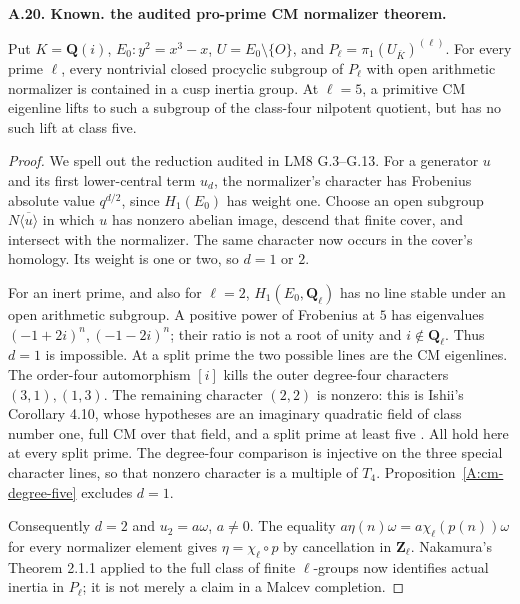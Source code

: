 \documentclass[11pt,oneside]{article}
\makeatletter
\newcounter{statementanchor}
\newenvironment{statement}[3]{%
 \refstepcounter{statementanchor}\def\@currentlabel{#1}%
 \par\addvspace{9pt}\noindent
 \textbf{#1. #2. #3.}\par\nobreak\noindent\ignorespaces
}{\par\addvspace{5pt}}
\makeatother
\begin{document}
\begin{statement}{A.20}{Known}{the audited pro-prime CM normalizer theorem}
\label{st:A.20}
\label{A:cm-prime-normalizer}
Put $K=\mathbf Q(i)$, $E_0:y^2=x^3-x$,
$U=E_0\setminus\{O\}$, and
$P_\ell=\pi_1(U_{\overline K})^{(\ell)}$.
For every prime $\ell$, every nontrivial closed
procyclic subgroup of $P_\ell$ with open arithmetic
normalizer is contained in a cusp inertia group.
At $\ell=5$, a primitive CM eigenline lifts to
such a subgroup of the class-four nilpotent
quotient, but has no such lift at class five.
\end{statement}
\begin{proof}
We spell out the reduction audited in LM8 G.3--G.13.
For a generator $u$ and its first lower-central
term $u_d$, the normalizer's character has
Frobenius absolute value $q^{d/2}$, since
$H_1(E_0)$ has weight one.  Choose an open
subgroup $N\overline{\langle u\rangle}$ in
which $u$ has nonzero abelian image, descend
that finite cover, and intersect with the
normalizer.  The same character now occurs
in the cover's homology.  Its weight is one
or two, so $d=1$ or $2$.

For an inert prime, and also for $\ell=2$,
$H_1(E_0,\mathbf Q_\ell)$ has no line stable
under an open arithmetic subgroup.  A positive
power of Frobenius at $5$ has eigenvalues
$(-1+2i)^n,(-1-2i)^n$; their ratio is not
a root of unity and $i\notin\mathbf Q_\ell$.
Thus $d=1$ is impossible.  At a split prime
the two possible lines are the CM eigenlines.
The order-four automorphism $[i]$ kills the
outer degree-four characters $(3,1),(1,3)$.
The remaining character $(2,2)$ is nonzero:
this is Ishii's Corollary 4.10, whose hypotheses
are an imaginary quadratic field of class
number one, full CM over that field, and a
split prime at least five
\cite{A_Ishii2025}.  All hold here at every
split prime.  The degree-four comparison
is injective on the three special character
lines, so that nonzero character is a multiple
of $T_4$.  Proposition~\ref{A:cm-degree-five}
excludes $d=1$.

Consequently $d=2$ and $u_2=a\omega$, $a\ne0$.
The equality
$a\eta(n)\omega=a\chi_\ell(p(n))\omega$
for every normalizer element gives
$\eta=\chi_\ell\circ p$ by cancellation in
$\mathbf Z_\ell$.  Nakamura's Theorem 2.1.1
applied to the full class of finite
$\ell$-groups now identifies actual inertia
in $P_\ell$; it is not merely a claim in a
Malcev completion.


\end{proof}
\end{document}
